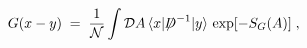 \begin{equation}\label{eq:g1}
G(x-y) \;=\; \frac{1}{{\mathcal N}} \int {\mathcal D}A \,
\langle x| {\not \!\! D}^{-1} |y \rangle \, \exp [ - S_G(A) ] \;,
\end{equation}

